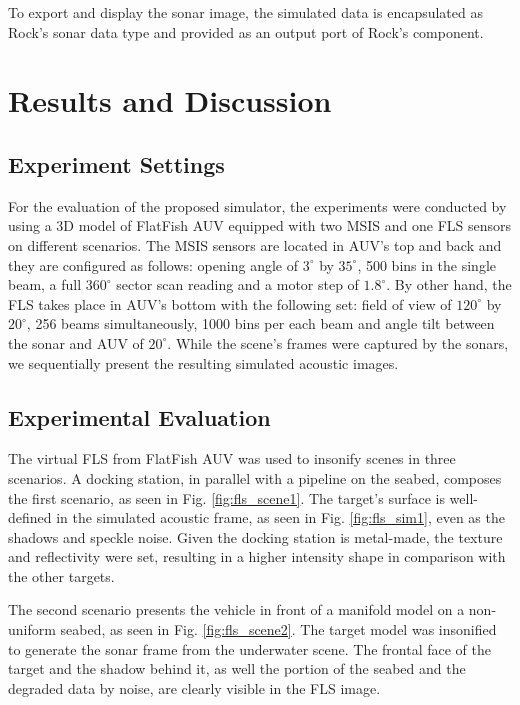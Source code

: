 \documentclass[final,5p,times]{elsarticle}
\begin{document}
To export and display the sonar image, the simulated data is encapsulated as Rock's sonar data type and provided as an output port of Rock's component.


\section{Results and Discussion}
\label{results}

\subsection{Experiment Settings}

For the evaluation of the proposed simulator, the experiments were conducted by using a 3D model of FlatFish AUV equipped with two MSIS and one FLS sensors on different scenarios. The MSIS sensors are located in AUV's top and back and they are configured as follows: opening angle of $3^{\circ}$ by $35^{\circ}$, 500 bins in the single beam, a full $360^{\circ}$ sector scan reading and a motor step of $1.8^{\circ}$. By other hand, the FLS takes place in AUV's bottom with the following set: field of view of $120^{\circ}$ by $20^{\circ}$, 256 beams simultaneously, 1000 bins per each beam and angle tilt between the sonar and AUV of $20^{\circ}$. While the scene's frames were captured by the sonars, we sequentially present the resulting simulated acoustic images.

\subsection{Experimental Evaluation}

The virtual FLS from FlatFish AUV was used to insonify scenes in three scenarios. A docking station, in parallel with a pipeline on the seabed, composes the first scenario, as seen in Fig. \ref{fig:fls_scene1}. The target's surface is well-defined in the simulated acoustic frame, as seen in Fig. \ref{fig:fls_sim1}, even as the shadows and speckle noise. Given the docking station is metal-made, the texture and reflectivity were set, resulting in a higher intensity shape in comparison with the other targets.

The second scenario presents the vehicle in front of a manifold model on a non-uniform seabed, as seen in Fig. \ref{fig:fls_scene2}. The target model was insonified to generate the sonar frame from the underwater scene. The frontal face of the target and the shadow behind it, as well the portion of the seabed and the degraded data by noise, are clearly visible in the FLS image.
\end{document}
